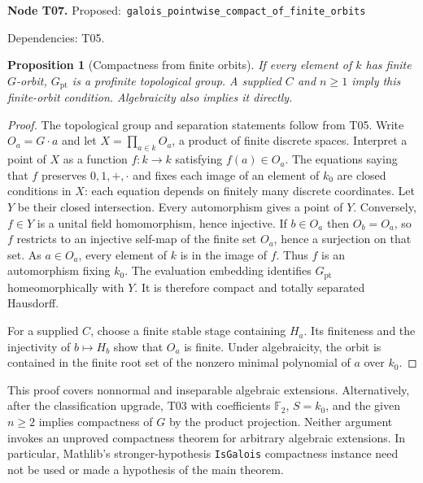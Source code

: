 \documentclass[11pt]{article}
\newtheorem{proposition}[theorem]{Proposition}
\theoremstyle{remark}\newtheorem{remark}[theorem]{Remark}
\newcommand{\F}{\mathbb F}
\newcommand{\code}[1]{{\normalfont\nolinkurl{#1}}}
\newcommand{\node}[3]{\par\Needspace{8\baselineskip}\smallskip\noindent\textbf{Node #1.}\quad
 \textsf{Proposed:}\ \code{#2}\par\noindent
 \textsf{Dependencies:} #3.\par\smallskip}
\begin{document}
\node{T07}{galois_pointwise_compact_of_finite_orbits}{T05}
\begin{proposition}[Compactness from finite orbits]\label{prop:t07}
If every element of $k$ has finite $G$-orbit, $G_{\mathrm{pt}}$ is a
profinite topological group. A supplied $C$ and $n\geq1$ imply this
finite-orbit condition. Algebraicity also implies it directly.
\end{proposition}
\begin{proof}
The topological group and separation statements follow from T05.
Write $O_a=G\cdot a$ and let $X=\prod_{a\in k}O_a$, a product of
finite discrete spaces. Interpret a point of $X$ as a function
$f:k\to k$ satisfying $f(a)\in O_a$. The equations saying that $f$
preserves $0,1,+,\cdot$ and fixes each image of an element of $k_0$
are closed conditions in $X$: each equation depends on finitely many
discrete coordinates. Let $Y$ be their closed intersection. Every
automorphism gives a point of $Y$. Conversely, $f\in Y$ is a unital
field homomorphism, hence injective. If $b\in O_a$ then $O_b=O_a$,
so $f$ restricts to an injective self-map of the finite set $O_a$,
hence a surjection on that set. As $a\in O_a$, every element of $k$
is in the image of $f$. Thus $f$ is an automorphism fixing $k_0$.
The evaluation embedding identifies $G_{\mathrm{pt}}$ homeomorphically
with $Y$. It is therefore compact and totally separated Hausdorff.

For a supplied $C$, choose a finite stable stage containing $H_a$.
Its finiteness and the injectivity of $b\mapsto H_b$ show that $O_a$
is finite. Under algebraicity, the orbit is contained in the finite
root set of the nonzero minimal polynomial of $a$ over $k_0$.
\end{proof}

This proof covers nonnormal and inseparable algebraic extensions.
Alternatively, after the classification upgrade, T03 with coefficients
$\F_2$, $S=k_0$, and the given $n\geq2$ implies compactness of $G$
by the product projection. Neither argument invokes an unproved
compactness theorem for arbitrary algebraic extensions. In particular,
Mathlib's stronger-hypothesis \code{IsGalois} compactness instance need
not be used or made a hypothesis of the main theorem.
\end{document}
